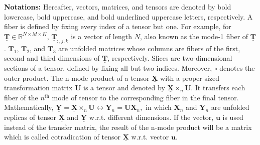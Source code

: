 \documentclass{article}
\begin{document}
\textbf{Notations:} Hereafter, vectors, matrices, and tensors are denoted by bold lowercase, bold uppercase, and bold underlined uppercase letters, respectively.
A fiber is defined by fixing every index of a tensor but one.
For example, for $\underline{\boldsymbol{T}} \in \mathbb{R}^{N \times M \times K}$, $\underline{\boldsymbol{T}}_{:,j,k} $ is a vector of length $N$, also known as the mode-1 fiber of $\underline{\boldsymbol{T}}$.  $\boldsymbol{T}_1$, $\boldsymbol{T}_2$, and $\boldsymbol{T}_3$ are unfolded matrices whose columns are fibers of the first, second and third dimensions of $\underline{\boldsymbol{T}}$, respectively.  Slices are two-dimensional
sections of a tensor, defined by fixing all but two indices. Moreover, $\circ$ denotes the outer product. The n-mode product of a tensor $\boldsymbol{\underline{X}}$ with a proper sized transformation matrix $\boldsymbol{U}$ is a tensor and denoted by $\boldsymbol{\underline{X}}\times_n \boldsymbol{U}$. It transfers each fiber of the $n^{\text{th}}$ mode of tensor to the corresponding fiber in the final tensor. Mathematically,
$
\boldsymbol{\underline{Y}}=\boldsymbol{\underline{X}}\times_n \boldsymbol{U} \leftrightarrow \boldsymbol{Y}_n=\boldsymbol{U}\boldsymbol{X}_n, 
$
in which $\boldsymbol{X}_n$ and $\boldsymbol{Y}_n$  are unfolded replicas of tensor $\boldsymbol{\underline{X}}$ and $\boldsymbol{\underline{Y}}$ w.r.t. different dimensions. If the vector, $\boldsymbol{u}$ is used instead of the transfer matrix, the result of the n-mode product will be a matrix which is called cotradication of tensor $\underline{\boldsymbol{X}}$ w.r.t. vector $\boldsymbol{u}$.
\vspace{-2mm}
\end{document}

